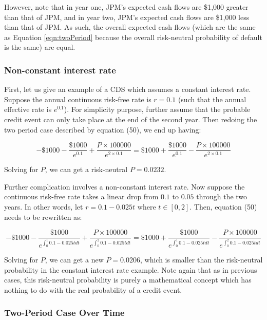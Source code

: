 \documentclass{jss}
\begin{document}
However, note that in year one, JPM's expected cash flows are \$1,000 greater than that of JPM, and in year two, JPM's expected cash flows are \$1,000 less than that of JPM. As such, the overall expected cash flows (which are the same as Equation \ref{eqn:twoPeriod} because the overall risk-neutral probability of default is the same) are equal.


\subsubsection{Non-constant interest rate}
\label{sec:nonConstantInterestRate}

First, let us give an example of a CDS which assumes a constant interest rate. Suppose the annual continuous risk-free rate is $r = 0.1$ (such that the annual effective rate is $e^{0.1}$). For simplicity purpose, further assume that the probable credit event can only take place at the end of the second year. Then redoing the two period case described by equation (50), we end up having:

$$-\$1000 - \frac{\$ 1000}{e^{0.1}} + \frac{P \times 100000}{e^{2\times 0.1}} = \$1000 + \frac{\$ 1000}{e^{0.1}} - \frac{P \times 100000}{e^{2\times 0.1}}$$

Solving for $P$, we can get a risk-neutral $P = 0.0232$.

Further complication involves a non-constant interest rate. Now suppose the continuous risk-free rate takes a linear drop from $0.1$ to $0.05$ through the two years. In other words, let $r = 0.1 - 0.025t$ where $t \in [0, 2]$. Then,  equation (50) needs to be rewritten as:

$$-\$1000 - \frac{\$ 1000}{e^{\int_0^1 0.1 - 0.025t dt}} + \frac{P \times 100000}{e^{\int_0^2 0.1 - 0.025t dt}} = \$1000 + \frac{\$ 1000}{e^{\int_0^1 0.1 - 0.025t dt}} - \frac{P \times 100000}{e^{\int_0^2 0.1 - 0.025t dt}}$$

Solving for $P$, we can get a new $P = 0.0206$, which is smaller than the risk-neutral probability in the constant interest rate example. Note again that as in previous cases, this risk-neutral probability is purely a mathematical concept which has nothing to do with the real probability of a credit event.

\subsubsection{Two-Period Case Over Time}
\end{document}
